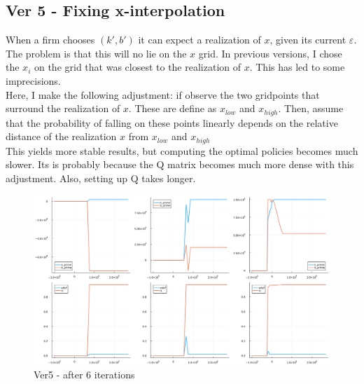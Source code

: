 \documentclass[12pt]{article}
\begin{document}
\subsection*{Ver 5 - Fixing x-interpolation}
When a firm chooses $(k',b')$ it can expect a realization of $x$, given its current $\varepsilon$. The problem is that this will no lie on the $x$ grid. In previous versions, I chose the $x_i$ on the grid that was closest to the realization of $x$. This has led to some imprecisions.  \vspace{3mm} \\
Here, I make the following adjustment: if observe the two gridpoints that surround the realization of $x$. These are define as $x_{low}$ and $x_{high}$. Then, assume that the probability of falling on these points linearly depends on the relative distance of the realization $x$ from $x_{low}$ and $x_{high}$ \vspace{3mm} \\
This yields more stable results, but computing the optimal policies becomes much slower. Its is probably because the Q matrix becomes much more dense with this adjustment. Also, setting up Q takes longer.





\begin{figure}[H]  %
    \centering
    \caption{Ver5 - after 6 iterations} \label{chart:CFLcdf}
    \includegraphics[width=1\textwidth]{ver5.png}
\end{figure}
\end{document}
